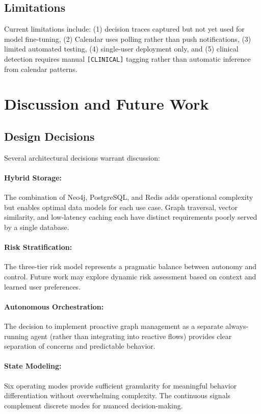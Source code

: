 \documentclass[11pt,a4paper]{article}
\begin{document}
\subsection{Limitations}

Current limitations include: (1) decision traces captured but not yet used for model fine-tuning, (2) Calendar uses polling rather than push notifications, (3) limited automated testing, (4) single-user deployment only, and (5) clinical detection requires manual \texttt{[CLINICAL]} tagging rather than automatic inference from calendar patterns.

\section{Discussion and Future Work}
\label{sec:discussion}

\subsection{Design Decisions}

Several architectural decisions warrant discussion:

\paragraph{Hybrid Storage:} The combination of Neo4j, PostgreSQL, and Redis adds operational complexity but enables optimal data models for each use case. Graph traversal, vector similarity, and low-latency caching each have distinct requirements poorly served by a single database.

\paragraph{Risk Stratification:} The three-tier risk model represents a pragmatic balance between autonomy and control. Future work may explore dynamic risk assessment based on context and learned user preferences.

\paragraph{Autonomous Orchestration:} The decision to implement proactive graph management as a separate always-running agent (rather than integrating into reactive flows) provides clear separation of concerns and predictable behavior.

\paragraph{State Modeling:} Six operating modes provide sufficient granularity for meaningful behavior differentiation without overwhelming complexity. The continuous signals complement discrete modes for nuanced decision-making.
\end{document}

